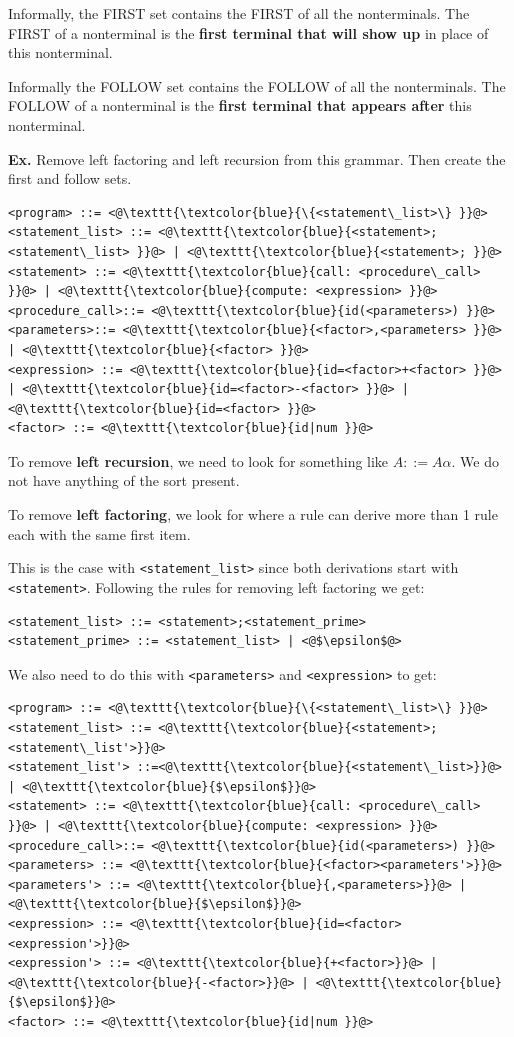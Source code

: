 \documentclass[12pt,letterpaper]{article} \usepackage{amsmath} \usepackage{graphicx} \usepackage[margin=1in]{geometry} \usepackage{longtable}  \usepackage{amssymb}
\begin{document}
	Informally, the FIRST set contains the FIRST of all the nonterminals. The FIRST of a nonterminal is the \textbf{first terminal that will show up} in place of this nonterminal. 
	
	Informally the FOLLOW set contains the FOLLOW of all the nonterminals. The FOLLOW of a nonterminal is the \textbf{first terminal that appears after} this nonterminal. 
	
	\begin{mdframed}
		\textbf{Ex.} Remove left factoring and left recursion from this grammar. Then create the first and follow sets. 
		\begin{lstlisting}
<program> ::= <@\texttt{\textcolor{blue}{\{<statement\_list>\} }}@>
<statement_list> ::= <@\texttt{\textcolor{blue}{<statement>;<statement\_list> }}@> | <@\texttt{\textcolor{blue}{<statement>; }}@> 
<statement> ::= <@\texttt{\textcolor{blue}{call: <procedure\_call> }}@> | <@\texttt{\textcolor{blue}{compute: <expression> }}@> 
<procedure_call>::= <@\texttt{\textcolor{blue}{id(<parameters>) }}@> 
<parameters>::= <@\texttt{\textcolor{blue}{<factor>,<parameters> }}@> | <@\texttt{\textcolor{blue}{<factor> }}@> 
<expression> ::= <@\texttt{\textcolor{blue}{id=<factor>+<factor> }}@> | <@\texttt{\textcolor{blue}{id=<factor>-<factor> }}@> | <@\texttt{\textcolor{blue}{id=<factor> }}@> 
<factor> ::= <@\texttt{\textcolor{blue}{id|num }}@> 
		\end{lstlisting}
		To remove \textbf{left recursion}, we need to look for something like $A::=A\alpha$. We do not have anything of the sort present. 
		
		To remove \textbf{left factoring}, we look for where a rule can derive more than 1 rule each with the same first item. 
		
		This is the case with \verb*|<statement_list>| since both derivations start with \verb*|<statement>|. Following the rules for removing left factoring we get:
		\begin{lstlisting}
<statement_list> ::= <statement>;<statement_prime> 
<statement_prime> ::= <statement_list> | <@$\epsilon$@>
		\end{lstlisting}
		We also need to do this with \verb*|<parameters>| and \verb*|<expression>| to get:
		\begin{lstlisting}
<program> ::= <@\texttt{\textcolor{blue}{\{<statement\_list>\} }}@>
<statement_list> ::= <@\texttt{\textcolor{blue}{<statement>;<statement\_list'>}}@> 
<statement_list'> ::=<@\texttt{\textcolor{blue}{<statement\_list>}}@> | <@\texttt{\textcolor{blue}{$\epsilon$}}@> 
<statement> ::= <@\texttt{\textcolor{blue}{call: <procedure\_call> }}@> | <@\texttt{\textcolor{blue}{compute: <expression> }}@> 
<procedure_call>::= <@\texttt{\textcolor{blue}{id(<parameters>) }}@> 
<parameters> ::= <@\texttt{\textcolor{blue}{<factor><parameters'>}}@> 
<parameters'> ::= <@\texttt{\textcolor{blue}{,<parameters>}}@> | <@\texttt{\textcolor{blue}{$\epsilon$}}@>
<expression> ::= <@\texttt{\textcolor{blue}{id=<factor><expression'>}}@> 
<expression'> ::= <@\texttt{\textcolor{blue}{+<factor>}}@> | <@\texttt{\textcolor{blue}{-<factor>}}@> | <@\texttt{\textcolor{blue}{$\epsilon$}}@>
<factor> ::= <@\texttt{\textcolor{blue}{id|num }}@> 
		\end{lstlisting}
	

\end{mdframed}
\end{document}
